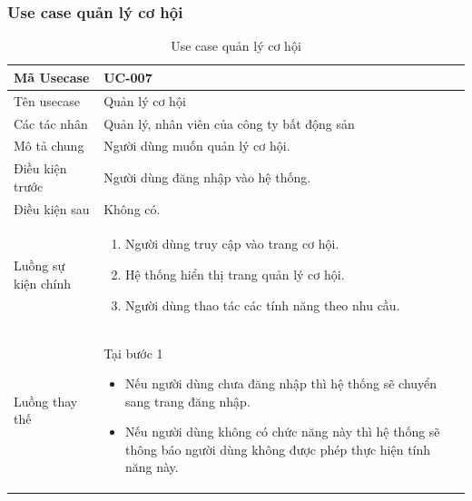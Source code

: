 \documentclass[12pt,a4paper]{article}
\begin{document}
    \subsubsection*{Use case quản lý cơ hội}
    \begin{table}[H]
        \centering
        \begin{tabular}{|p{3.5cm}|p{11.5cm}|c|}
            \hline
            Mã Usecase      & UC-007                                      \\
            \hline
            Tên usecase     & Quản lý cơ hội                              \\
            \hline
            Các tác nhân    & Quản lý, nhân viên của công ty bất động sản \\
            \hline
            Mô tả chung     & Người dùng muốn quản lý cơ hội.             \\
            \hline

            Điều kiện trước & Người dùng đăng nhập vào hệ thống.          \\
            \hline

            Điều kiện sau   & Không có.                                   \\
            \hline

            Luồng sự kiện chính & \vspace{-.8cm}\begin{enumerate}
                                                    \item Người dùng truy cập vào trang cơ hội.
                                                    \item Hệ thống hiển thị trang quản lý cơ hội.
                                                    \item Người dùng thao tác các tính năng theo nhu cầu.
            \end{enumerate}
            \\
            \hline
            Luồng thay thế & Tại bước 1\newline
            \vspace{-.8cm}\begin{itemize}
                              \item Nếu người dùng chưa đăng nhập thì hệ thống sẽ chuyển sang trang đăng nhập.
                              \item Nếu người dùng không có chức năng này thì hệ thống sẽ thông báo người dùng không được phép thực hiện tính năng này.
            \end{itemize}

            \\ \hline
        \end{tabular}
        \caption{Use case quản lý cơ hội}

    \end{table}
\end{document}
